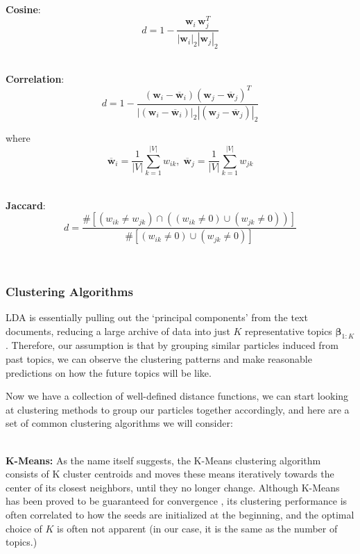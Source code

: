 \documentclass[conference]{IEEEtran}
\begin{document}
\-\\
\textbf{Cosine}: 
\begin{equation*}
d = 1 - \frac{\mathbf{w}_i\,\mathbf{w}_j^T}{|\mathbf{w}_i|_2|\mathbf{w}_j|_2}
\end{equation*}

\-\\
\textbf{Correlation}: 
\begin{equation*}
d = 1 - \frac{(\mathbf{w}_i - \overline{\mathbf{w}}_i)(\mathbf{w}_j - \overline{\mathbf{w}}_j)^T}{|(\mathbf{w}_i - \overline{\mathbf{w}}_i)|_2|(\mathbf{w}_j - \overline{\mathbf{w}}_j)|_2}
\end{equation*}

where 
\begin{equation*}
	\overline{\mathbf{w}}_i = \frac{1}{|V|}\sum_{k=1}^{|V|}w_{ik},\;
	\overline{\mathbf{w}}_j = \frac{1}{|V|}\sum_{k=1}^{|V|}w_{jk}
\end{equation*}

\-\\
\textbf{Jaccard}: 
\begin{equation*}
	d = \frac{\# \left[(w_{ik} \neq w_{jk})\cap((w_{ik} \neq 0)\cup(w_{jk} \neq 0))\right]}{\#\left[(w_{ik} \neq 0)\cup(w_{jk} \neq 0)\right]}
\end{equation*}

\-\\

\subsubsection{Clustering Algorithms}
LDA is essentially pulling out the `principal components' from the text documents, reducing a large archive of data into just $K$ representative topics $\mathbf{\beta}_{1:K}$. Therefore, our assumption is that by grouping similar particles induced from past topics, we can observe the clustering patterns and make reasonable predictions on how the future topics will be like.

Now we have a collection of well-defined distance functions, we can start looking at clustering methods to group our particles together accordingly, and here are a set of common clustering algorithms we will consider:

\-\\
\textbf{K-Means:} As the name itself suggests, the K-Means clustering algorithm consists of K cluster centroids and moves these means iteratively towards the center of its closest neighbors, until they no longer change. Although K-Means has been proved to be guaranteed for convergence \cite{selim1984}, its clustering performance is often correlated to how the seeds are initialized at the beginning, and the optimal choice of $K$ is often not apparent (in our case, it is the same as the number of topics.)
\end{document}
